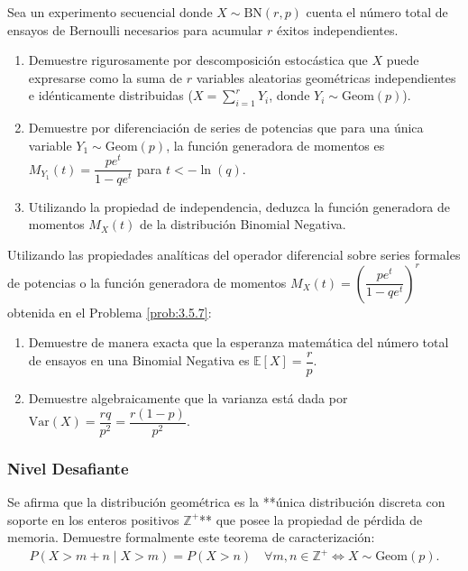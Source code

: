\begin{problema}
	\label{prob:3.5.7}
	Sea un experimento secuencial donde $X \sim \text{BN}(r, p)$ cuenta el número total de ensayos de Bernoulli necesarios para acumular $r$ éxitos independientes.
	\begin{enumerate}
		\item Demuestre rigurosamente por descomposición estocástica que $X$ puede expresarse como la suma de $r$ variables aleatorias geométricas independientes e idénticamente distribuidas ($X = \sum_{i=1}^r Y_i$, donde $Y_i \sim \text{Geom}(p)$).
		\item Demuestre por diferenciación de series de potencias que para una única variable $Y_1 \sim \text{Geom}(p)$, la función generadora de momentos es $M_{Y_1}(t) = \dfrac{p e^t}{1 - q e^t}$ para $t < -\ln(q)$.
		\item Utilizando la propiedad de independencia, deduzca la función generadora de momentos $M_X(t)$ de la distribución Binomial Negativa.
	\end{enumerate}
\end{problema}

\begin{problema}
	\label{prob:3.5.8}
	Utilizando las propiedades analíticas del operador diferencial sobre series formales de potencias o la función generadora de momentos $M_X(t) = \left(\dfrac{p e^t}{1 - q e^t}\right)^r$ obtenida en el Problema \ref{prob:3.5.7}:
	\begin{enumerate}
		\item Demuestre de manera exacta que la esperanza matemática del número total de ensayos en una Binomial Negativa es $\mathbb{E}[X] = \dfrac{r}{p}$.
		\item Demuestre algebraicamente que la varianza está dada por $\text{Var}(X) = \dfrac{r q}{p^2} = \dfrac{r(1-p)}{p^2}$.
	\end{enumerate}
\end{problema}

\subsubsection*{Nivel Desafiante}

\begin{problema}
	\label{prob:3.5.9}
	Se afirma que la distribución geométrica es la **única distribución discreta con soporte en los enteros positivos $\mathbb{Z}^+$** que posee la propiedad de pérdida de memoria. Demuestre formalmente este teorema de caracterización:
	\begin{align*}
		P(X > m+n \mid X > m) = P(X > n) \quad \forall m, n \in \mathbb{Z}^+ \iff X \sim \text{Geom}(p).
	\end{align*}
\end{problema}

